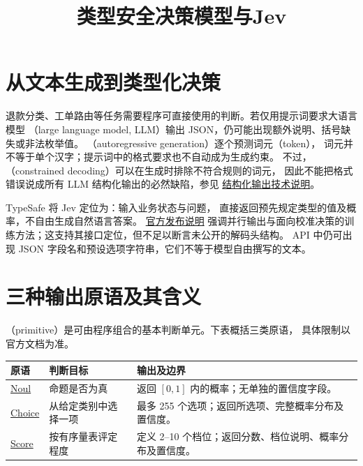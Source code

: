 \documentclass[UTF8,12pt,a4paper,fontset=fandol]{ctexart}
\title{类型安全决策模型与Jev}
\author{}
\date{}
\begin{document}
\maketitle

\section{从文本生成到类型化决策}
\label{sec:jev-motivation}

退款分类、工单路由等任务需要程序可直接使用的判断。若仅用提示词要求大语言模型
（large language model, LLM）输出 JSON，仍可能出现额外说明、括号缺失或非法枚举值。
（autoregressive generation）逐个预测词元（token），
词元并不等于单个汉字；提示词中的格式要求也不自动成为生成约束。
不过，（constrained decoding）可以在生成时排除不符合规则的词元，
因此不能把格式错误说成所有 LLM 结构化输出的必然缺陷，参见
\href{https://openai.com/index/introducing-structured-outputs-in-the-api/}{结构化输出技术说明}。

TypeSafe 将 Jev 定位为：输入业务状态与问题，
直接返回预先规定类型的值及概率，不自由生成自然语言答案。
\href{https://typesafe.ai/blog/introducing-system-one-models-and-jev}{官方发布说明}
强调并行输出与面向校准决策的训练方法；这支持其接口定位，但不足以断言未公开的解码头结构。
API 中仍可出现 JSON 字段名和预设选项字符串，它们不等于模型自由撰写的文本。

\section{三种输出原语及其含义}
\label{sec:jev-primitives}

（primitive）是可由程序组合的基本判断单元。下表概括三类原语，
具体限制以官方文档为准。

\begin{center}
\begin{tabularx}{\textwidth}{@{}lYY@{}}
\toprule
原语 & 判断目标 & 输出及边界 \\
\midrule
\href{https://docs.typesafe.ai/primitives/noul}{Noul}
& 命题是否为真 & 返回 $[0,1]$ 内的概率；无单独的置信度字段。 \\
\href{https://docs.typesafe.ai/primitives/choice}{Choice}
& 从给定类别中选择一项 & 最多 255 个选项；返回所选项、完整概率分布及置信度。 \\
\href{https://docs.typesafe.ai/primitives/score}{Score}
& 按有序量表评定程度 & 定义 2--10 个档位；返回分数、档位说明、概率分布及置信度。 \\
\bottomrule
\end{tabularx}
\end{center}
\end{document}
